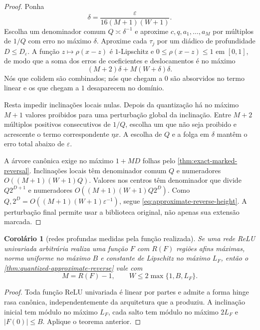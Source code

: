 \documentclass[11pt,a4paper]{article}
\newtheorem{corollary}[theorem]{Corolário}
\theoremstyle{definition}
\theoremstyle{remark}
\begin{document}
\begin{proof}
Ponha
\[
 \delta=\frac{\varepsilon}{16(M+1)(W+1)}.
\]
Escolha um denominador comum $Q\asymp\delta^{-1}$ e aproxime
$c,q,a_1,\ldots,a_M$ por múltiplos de $1/Q$ com erro no máximo $\delta$.
Aproxime cada $\tau_j$ por um diádico de profundidade
$D\le D_\varepsilon$. A função $z\mapsto\rho(x-z)$ é $1$-Lipschitz e
$0\le\rho(x-z)\le1$ em $[0,1]$, de modo que a soma dos erros de coeficientes
e deslocamentos é no máximo
\[
 (M+2)\delta+M(W+\delta)\delta.
\]
Nós que colidem são combinados; nós que chegam a $0$ são absorvidos no termo
linear e os que chegam a $1$ desaparecem no domínio.

Resta impedir inclinações locais nulas. Depois da quantização há no máximo
$M+1$ valores proibidos para uma perturbação global da inclinação. Entre
$M+2$ múltiplos positivos consecutivos de $1/Q$, escolha um que não seja
proibido e acrescente o termo correspondente $\eta x$. A escolha de $Q$ e a
folga em $\delta$ mantêm o erro total abaixo de $\varepsilon$.

A árvore canônica exige no máximo $1+MD$ folhas pelo
\cref{thm:exact-marked-reversal}. Inclinações locais têm denominador comum
$Q$ e numeradores $O((M+1)(W+1)Q)$. Valores nos centros têm denominador que
divide $Q2^{D+1}$ e numeradores
$O((M+1)(W+1)Q2^D)$. Como
$Q,2^D=O((M+1)(W+1)\varepsilon^{-1})$, segue
\eqref{eq:approximate-reverse-height}. A perturbação final permite usar a
biblioteca original, não apenas sua extensão marcada.
\end{proof}

\begin{corollary}[redes profundas medidas pela função realizada]
\label{cor:deep-functional-reverse}
Se uma rede ReLU univariada arbitrária realiza uma função $F$ com $R(F)$
regiões afins máximas, norma uniforme no máximo $B$ e constante de Lipschitz
no máximo $L_F$, então o \cref{thm:quantized-approximate-reverse} vale com
\begin{equation}
 M=R(F)-1,
 \qquad
 W\le2\max\{1,B,L_F\}.
 \label{eq:deep-realized-resources}
\end{equation}
\end{corollary}

\begin{proof}
Toda função ReLU univariada é linear por partes e admite a forma hinge rasa
canônica, independentemente da arquitetura que a produziu. A inclinação
inicial tem módulo no máximo $L_F$, cada salto tem módulo no máximo $2L_F$ e
$|F(0)|\le B$. Aplique o teorema anterior.
\end{proof}
\end{document}
